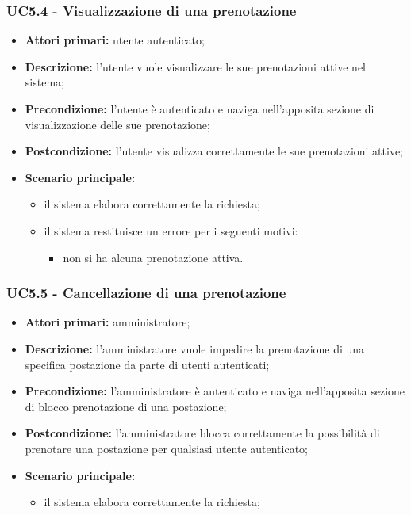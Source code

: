 \subsubsection{UC5.4 - Visualizzazione di una prenotazione}

\begin{itemize}
\item \textbf{Attori primari:} utente autenticato;
\item \textbf{Descrizione:} l’utente vuole visualizzare le sue prenotazioni attive nel sistema;
\item \textbf{Precondizione:} l’utente è autenticato e naviga nell’apposita sezione di visualizzazione delle sue prenotazione;
\item \textbf{Postcondizione:} l’utente visualizza correttamente le sue prenotazioni attive;
\item \textbf{Scenario principale:} 
	\begin{itemize}
		\item il sistema elabora correttamente la richiesta;
		\item il sistema restituisce un errore per i seguenti motivi:
		\begin{itemize}
			\item non si ha alcuna prenotazione attiva.
		\end{itemize}
	\end{itemize}
\end{itemize}

\subsubsection{UC5.5 - Cancellazione di una prenotazione}

\begin{itemize}
\item \textbf{Attori primari:} amministratore;
\item \textbf{Descrizione:} l’amministratore vuole impedire la prenotazione di una specifica postazione da parte di utenti autenticati;
\item \textbf{Precondizione:} l’amministratore è autenticato e naviga nell’apposita sezione di blocco prenotazione di una postazione;
\item \textbf{Postcondizione:} l’amministratore blocca correttamente la possibilità di prenotare una postazione per qualsiasi utente autenticato;
\item \textbf{Scenario principale:} 
	\begin{itemize}
		\item il sistema elabora correttamente la richiesta;
		\end{itemize}
\end{itemize}
